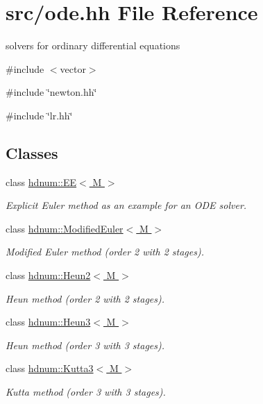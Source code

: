 \hypertarget{ode_8hh}{
\section{src/ode.hh File Reference}
\label{ode_8hh}
}


solvers for ordinary differential equations  


{\ttfamily \#include $<$vector$>$}\par
{\ttfamily \#include \char`\"{}newton.hh\char`\"{}}\par
{\ttfamily \#include \char`\"{}lr.hh\char`\"{}}\par
\subsection*{Classes}
\begin{DoxyCompactItemize}
\item 
class \hyperlink{classhdnum_1_1EE}{hdnum::EE$<$ M $>$}
\begin{DoxyCompactList}\small\item\em Explicit Euler method as an example for an ODE solver. \item\end{DoxyCompactList}\item 
class \hyperlink{classhdnum_1_1ModifiedEuler}{hdnum::ModifiedEuler$<$ M $>$}
\begin{DoxyCompactList}\small\item\em Modified Euler method (order 2 with 2 stages). \item\end{DoxyCompactList}\item 
class \hyperlink{classhdnum_1_1Heun2}{hdnum::Heun2$<$ M $>$}
\begin{DoxyCompactList}\small\item\em Heun method (order 2 with 2 stages). \item\end{DoxyCompactList}\item 
class \hyperlink{classhdnum_1_1Heun3}{hdnum::Heun3$<$ M $>$}
\begin{DoxyCompactList}\small\item\em Heun method (order 3 with 3 stages). \item\end{DoxyCompactList}\item 
class \hyperlink{classhdnum_1_1Kutta3}{hdnum::Kutta3$<$ M $>$}
\begin{DoxyCompactList}\small\item\em Kutta method (order 3 with 3 stages). \item\end{DoxyCompactList}\item 

\end{DoxyCompactItemize}
